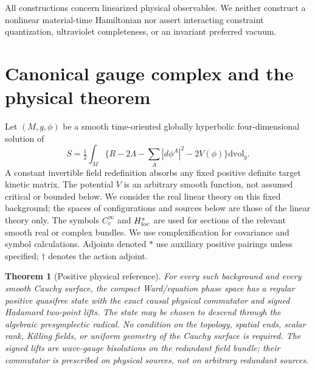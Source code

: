 \documentclass[11pt]{article}
\newtheorem{theorem}{Theorem}[section]
\newcommand{\vol}{\mathrm{dvol}}
\begin{document}
All constructions concern linearized physical observables. We
neither construct a nonlinear material-time Hamiltonian nor assert
interacting constraint quantization, ultraviolet completeness, or
an invariant preferred vacuum.

\section{Canonical gauge complex and the physical theorem}\label{sec:general}
Let $(M,g,\phi)$ be a smooth time-oriented globally hyperbolic
four-dimensional solution of
\[
 S=\tfrac12\int_M\{R-2\Lambda-\textstyle\sum_A|d\phi^A|^2-2V(\phi)\}\vol_g .
\]
A constant invertible field redefinition absorbs any fixed positive
definite target kinetic matrix. The potential $V$ is an arbitrary smooth
function, not assumed critical or bounded below. We consider the real
linear theory on this fixed background; the spaces of configurations and
sources below are those of the linear theory only. The symbols $C_c^\infty$
and $H^s_{\rm loc}$ are used for sections of the relevant smooth real or
complex bundles. We use complexification for covariance and symbol
calculations. Adjoints denoted $*$ use auxiliary positive pairings unless
specified; $\dagger$ denotes the action adjoint.

\begin{theorem}[Positive physical reference]\label{thm:generalstate}
For every such background and every smooth Cauchy surface, the compact
Ward/equation phase space has a regular positive quasifree state with the
exact causal physical commutator and signed Hadamard two-point lifts.
The state may be chosen to descend through the algebraic presymplectic
radical. No condition on the topology, spatial ends, scalar rank,
Killing fields, or uniform geometry of the Cauchy surface is required.
The signed lifts are wave-gauge bisolutions on the redundant field
bundle; their commutator is prescribed on physical sources, not on
arbitrary redundant sources.
\end{theorem}
\end{document}
